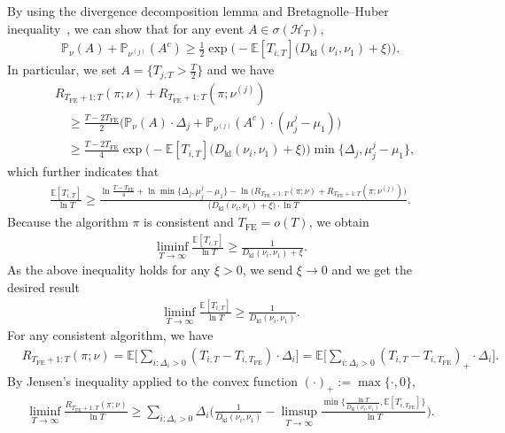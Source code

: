 \documentclass[twoside,11pt]{article}
\newcommand{\kl}{D_{\mathrm{kl}}}
\newcommand{\calH}{\mathcal{H}}
\newcommand{\bbE}{\mathbb{E}}
\newcommand{\bbP}{\mathbb{P}}
\newcommand{\Tfe}{T_{\mathrm{FE}}}
\begin{document}
By using the divergence decomposition lemma \citep[Lemma 15.1]{lattimore2020bandit} and Bretagnolle--Huber inequality~\citep[Theorem 14.2]{lattimore2020bandit}, we can show that for any  event $A\in\sigma(\calH_T)$,
\begin{align}
    \bbP_{\nu}(A) + \bbP_{\nu^{(j)}}(A^c)  
    \geq 
    \frac{1}{2}
        \exp
        \Big(
            -\bbE[T_{i,T}]\big(\kl(\nu_i,\nu_1)+\xi\big)
        \Big).
\end{align}
In particular, we set $A=\{T_{j,T}>\frac{T}{2}\}$ and we have
\begin{align}
    &R_{\Tfe+1:T} (\pi;\nu)+R_{\Tfe+1:T} (\pi;\nu^{(j)} )
    \\
    &\quad\geq 
        \frac{T-2\Tfe}{2} 
        \Big( 
            \bbP_{\nu}(A)\cdot\Delta_j + \bbP_{\nu^{(j)}}(A^c)\cdot (\mu_j^{j}-\mu_1)
        \Big)
    \\&
    \quad\geq
        \frac{T-2\Tfe}{4} 
        \exp
        \Big(
            -\bbE[T_{i,T}]\big(\kl(\nu_i,\nu_1)+\xi\big)
        \Big)
        \min\{\Delta_j,\mu_j^{j}-\mu_1\},
\end{align}
which further indicates that
\begin{align}
    \frac{\bbE[T_{i,T}]}{\ln T}
    \geq
    \frac{
        \ln\frac{T-\Tfe}{4}+\ln \min\{\Delta_j,\mu_j^{j}-\mu_1\}-\ln \big(R_{\Tfe+1:T} (\pi;\nu)+R_{\Tfe+1:T} (\pi;\nu^{(j)} )\big)
    }{\big(\kl(\nu_i,\nu_1)+\xi\big)\cdot \ln T}.
\end{align}
Because the algorithm $\pi$ is consistent and $\Tfe=o(T)$, we obtain 
\begin{align}
    \liminf_{T\to\infty}\frac{\bbE[T_{i,T}]}{\ln T}
    \geq
    \frac{1}{\kl(\nu_i,\nu_1)+\xi}.
\end{align}
As the above inequality holds for any $\xi>0$, we send $\xi\to0$ and we get the desired result
\begin{align}
    \liminf_{T\to\infty}\frac{\bbE[T_{i,T}]}{\ln T}
    \geq
    \frac{1}{\kl(\nu_i,\nu_1)}.
\end{align}
For any consistent algorithm, we have
\begin{align}
    &R_{\Tfe+1:T} (\pi;\nu ) 
    = 
        \bbE\bigg[
            \sum_{i:\Delta_i>0} (T_{i,T}-T_{i,\Tfe})\cdot \Delta_i
        \bigg]
    = 
        \bbE\bigg[
            \sum_{i:\Delta_i>0} (T_{i,T}-T_{i,\Tfe})_+\cdot \Delta_i
        \bigg].
\end{align}
 By Jensen's inequality applied to the convex function $(\cdot)_+:=\max\{\cdot,0\}$,
\begin{align}
    \liminf_{T\to\infty} \frac{R_{\Tfe+1:T} (\pi;\nu) }{\ln T}
    \geq 
        \sum_{i:\Delta_i>0}\Delta_i\bigg(\frac{1}{\kl(\nu_i,\nu_1)}
        -
        \limsup_{T\to\infty}
        \frac{\min\big\{\frac{\ln T}{\kl(\nu_i,\nu_1)},\bbE[T_{i,\Tfe}]\big\}}{\ln T}
        \bigg).
\end{align}
\end{document}
